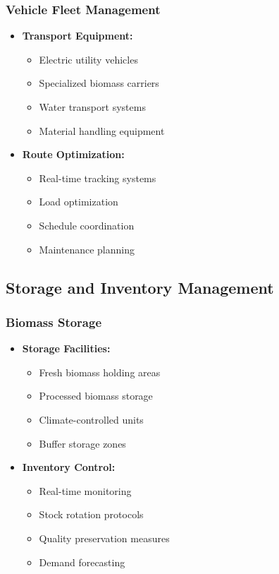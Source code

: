 \subsubsection{Vehicle Fleet Management}
\begin{itemize}
    \item \textbf{Transport Equipment:}
    \begin{itemize}
        \item Electric utility vehicles
        \item Specialized biomass carriers
        \item Water transport systems
        \item Material handling equipment
    \end{itemize}
    
    \item \textbf{Route Optimization:}
    \begin{itemize}
        \item Real-time tracking systems
        \item Load optimization
        \item Schedule coordination
        \item Maintenance planning
    \end{itemize}
\end{itemize}

\subsection{Storage and Inventory Management}

\subsubsection{Biomass Storage}
\begin{itemize}
    \item \textbf{Storage Facilities:}
    \begin{itemize}
        \item Fresh biomass holding areas
        \item Processed biomass storage
        \item Climate-controlled units
        \item Buffer storage zones
    \end{itemize}
    
    \item \textbf{Inventory Control:}
    \begin{itemize}
        \item Real-time monitoring
        \item Stock rotation protocols
        \item Quality preservation measures
        \item Demand forecasting
    \end{itemize}
\end{itemize}

